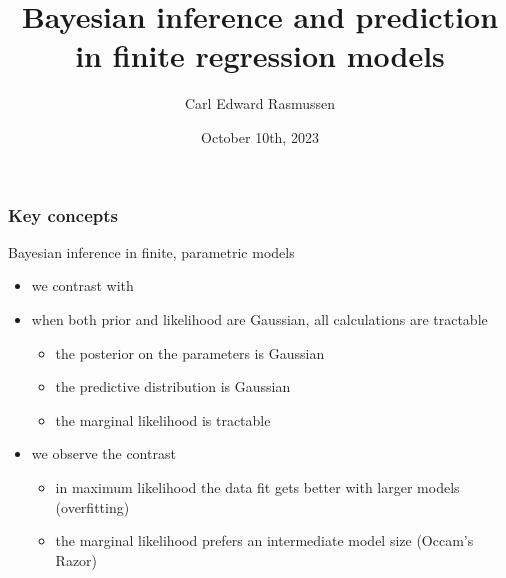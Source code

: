 

\title{Bayesian inference and prediction\\ in finite regression models}
\author{Carl Edward Rasmussen}
\date{October 10th, 2023}



\begin{frame}
\titlepage
\end{frame}

\begin{frame}
\frametitle{Key concepts}

Bayesian inference in finite, parametric models
\begin{itemize}
\item we contrast  with 
\item when both prior and likelihood are Gaussian, all calculations
  are tractable
\begin{itemize}
\item the posterior on the parameters is Gaussian
\item the predictive distribution is Gaussian
\item the marginal likelihood is tractable
\end{itemize}
\item we observe the contrast
\begin{itemize}
\item in maximum likelihood the data fit gets better with larger
  models (overfitting)
\item the marginal likelihood prefers an intermediate model size
  (Occam's Razor)
\end{itemize}
\end{itemize}
\end{frame}



